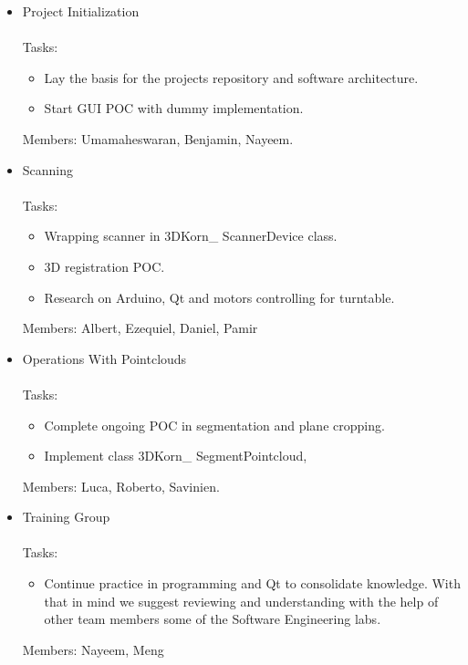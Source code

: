 \documentclass[11pt]{article} %
\begin{document}
\begin{itemize}
\item Project Initialization\\
~\\Tasks:
\begin{itemize}
\item Lay the basis for the projects repository and software architecture.
\item Start GUI POC with dummy implementation.
\end{itemize}
Members: Umamaheswaran, Benjamin, Nayeem.

\item Scanning ~\\
~\\Tasks:
\begin{itemize}
\item Wrapping scanner in 3DKorn\_ ScannerDevice class. 
\item 3D registration POC.
\item Research on Arduino, Qt and motors controlling for turntable.
\end{itemize}
Members: Albert, Ezequiel, Daniel, Pamir
	

\item Operations With Pointclouds~\\
~\\Tasks:
\begin{itemize}
\item Complete ongoing POC in segmentation and plane cropping.
\item Implement class 3DKorn\_ SegmentPointcloud, 
\end{itemize}
Members: Luca, Roberto, Savinien.


\item Training Group~\\
~\\Tasks:
\begin{itemize}
\item Continue practice in programming and Qt to consolidate knowledge. With that in mind we suggest reviewing and understanding with the help of other team members some of the Software Engineering labs. 
\end{itemize}
Members: Nayeem, Meng
\end{itemize}
\end{document}
